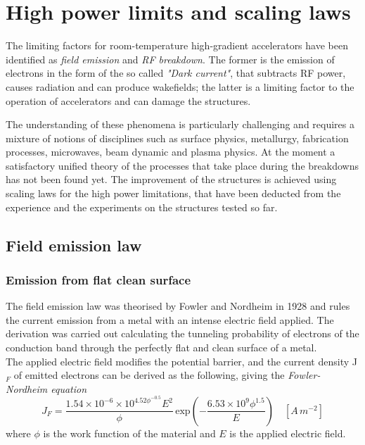 \section[High power limits and scaling laws]{High power limits and scaling laws}

The limiting factors for room-temperature high-gradient accelerators have been identified as \textit{field emission} and \textit{RF breakdown}. The former is the emission of electrons in the form of the so called \textit{"Dark current"}, that subtracts RF power, causes radiation and can produce wakefields; the latter is a limiting factor to the operation of accelerators and can damage the structures.\cite{Wang:1997ip}

The understanding of these phenomena is particularly challenging and requires a mixture of notions of disciplines such as surface physics, metallurgy, fabrication processes, microwaves, beam dynamic and plasma physics. At the moment a satisfactory unified theory of the processes that take place during the breakdowns has not been found yet. The improvement of the structures is achieved using scaling laws for the high power limitations, that have been deducted  from the experience and the experiments on the structures tested so far. 


\subsection[Field emission law]{Field emission law}

\subsubsection{Emission from flat clean surface}

The field emission law was theorised by Fowler and Nordheim in 1928 and rules the current emission from a metal with an intense electric field applied. The derivation was carried out calculating the tunneling probability of electrons of the conduction band through the perfectly flat and clean surface of a metal. \\The applied electric field modifies the potential barrier, and the current density J$_F$ of emitted electrons can be derived as the following, giving the  \textit{Fowler-Nordheim equation} \cite{Fowler173}
\begin{equation}
J_F = \frac{ 1.54\times10^{-6} \times 10^{4.52\phi^{-0.5}} E^2}{  \phi } \, \text{exp} \left ( -\frac{6.53\times 10^9 \phi^{1.5}}{E} \right ) \quad [A\,m^{-2}]  \label{FNlaw}
\end{equation}
where $\phi$ is the work function of the material and $E$ is the applied electric field.

